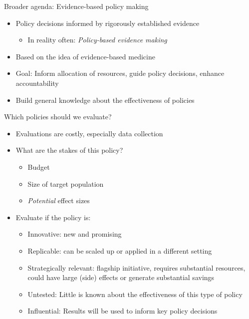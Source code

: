 \documentclass[
  ignorenonframetext,
]{beamer}
\providecommand{\tightlist}{%
  \setlength{\itemsep}{0pt}\setlength{\parskip}{0pt}}
\begin{document}
\begin{frame}{Broader agenda: Evidence-based policy making}
\label{broader-agenda-evidence-based-policy-making}
\begin{itemize}
\tightlist
\item
  Policy decisions informed by rigorously established evidence

  \begin{itemize}
  \tightlist
  \item
    In reality often: \emph{Policy-based evidence making}\\
  \end{itemize}
\item
  Based on the idea of evidence-based medicine\\
\item
  Goal: Inform allocation of resources, guide policy decisions, enhance
  accountability\\
\item
  Build general knowledge about the effectiveness of policies
\end{itemize}
\end{frame}

\begin{frame}{Which policies should we evaluate?}
\label{which-policies-should-we-evaluate}
\begin{itemize}
\tightlist
\item
  Evaluations are costly, especially data collection\\
\item
  What are the stakes of this policy?

  \begin{itemize}
  \tightlist
  \item
    Budget\\
  \item
    Size of target population\\
  \item
    \emph{Potential} effect sizes\\
  \end{itemize}
\item
  Evaluate if the policy is:

  \begin{itemize}
  \tightlist
  \item
    Innovative: new and promising\\
  \item
    Replicable: can be scaled up or applied in a different setting\\
  \item
    Strategically relevant: flagship initiative, requires substantial
    resources, could have large (side) effects or generate substantial
    savings\\
  \item
    Untested: Little is known about the effectiveness of this type of
    policy\\
  \item
    Influential: Results will be used to inform key policy decisions
  \end{itemize}
\end{itemize}
\end{frame}
\end{document}
